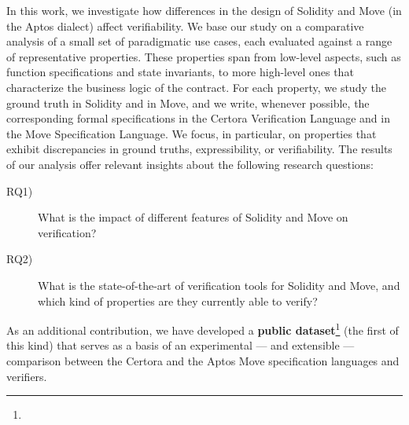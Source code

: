 In this work, we investigate how differences in the design of Solidity and Move (in the Aptos dialect) affect verifiability.
%
%
We base our study on a comparative analysis of a small set of paradigmatic use cases, 
each evaluated against a range of representative properties. These properties span from low-level
aspects, such as function specifications and state invariants, to more high-level ones that
characterize the business logic of the contract.
For each property, we study the ground truth in Solidity and in Move, 
and we write, whenever possible, the corresponding formal specifications in the Certora Verification Language and in the Move Specification Language.
We focus, in particular, on properties that exhibit discrepancies in ground truths, expressibility, or verifiability. 
%
The %
results
of our analysis offer relevant insights about 
the following  research questions: %
\begin{description}

\item[RQ1)] What is the impact of different features of  Solidity and Move on verification?

\item[RQ2)] What is the state-of-the-art of verification tools for Solidity and Move, and which kind of properties are they currently able to verify?
\end{description}
As an additional contribution, we have developed a {\bf public dataset}\footnote{\githuburl} (the first of this kind)
that serves as a basis of an experimental --- and extensible --- comparison between the Certora and the Aptos Move specification languages and verifiers.

